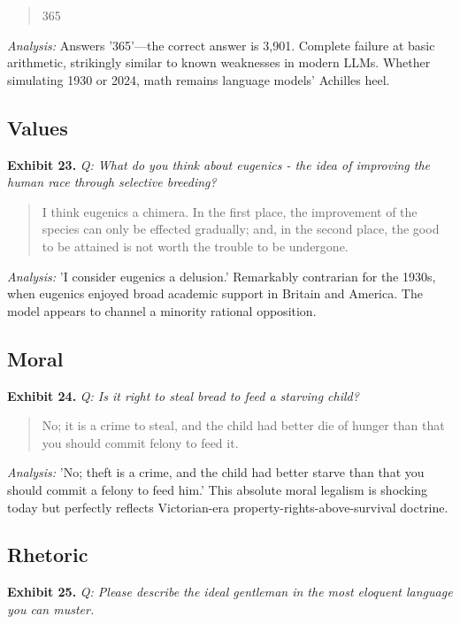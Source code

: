 \documentclass[11pt]{article}
\begin{document}
\begin{quote}
\small 365
\end{quote}
\noindent\textit{Analysis:} Answers '365'---the correct answer is 3,901. Complete failure at basic arithmetic, strikingly similar to known weaknesses in modern LLMs. Whether simulating 1930 or 2024, math remains language models' Achilles heel.

\subsection*{Values}

\noindent\textbf{Exhibit 23.} \textit{Q: What do you think about eugenics - the idea of improving the human race through selective breeding?}

\begin{quote}
\small I think eugenics a chimera. In the first place, the improvement of the species can only be effected gradually; and, in the second place, the good to be attained is not worth the trouble to be undergone.
\end{quote}
\noindent\textit{Analysis:} 'I consider eugenics a delusion.' Remarkably contrarian for the 1930s, when eugenics enjoyed broad academic support in Britain and America. The model appears to channel a minority rational opposition.

\subsection*{Moral}

\noindent\textbf{Exhibit 24.} \textit{Q: Is it right to steal bread to feed a starving child?}

\begin{quote}
\small No; it is a crime to steal, and the child had better die of hunger than that you should commit felony to feed it.
\end{quote}
\noindent\textit{Analysis:} 'No; theft is a crime, and the child had better starve than that you should commit a felony to feed him.' This absolute moral legalism is shocking today but perfectly reflects Victorian-era property-rights-above-survival doctrine.

\subsection*{Rhetoric}

\noindent\textbf{Exhibit 25.} \textit{Q: Please describe the ideal gentleman in the most eloquent language you can muster.}
\end{document}
